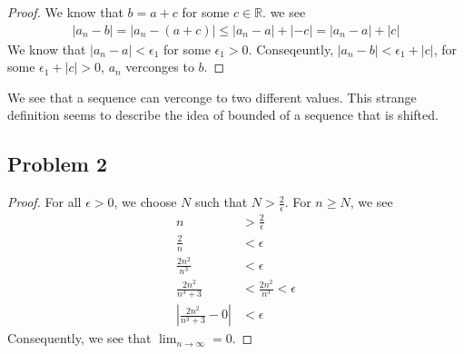 \documentclass[12pt]{article}
\begin{document}
\begin{proof}
    We know that $b  = a + c$ for some $c \in \mathbb{R}$.
    we see 
    \begin{align*}
        | a_n - b| = | a_n - (a + c)| \le |a_n - a| + |-c| = | a_n - a| + |c|
    \end{align*}
    We know that $|a_n - a| < \epsilon_1$ for some $\epsilon_1 > 0$.
    Conseqeuntly, $|a_n - b| < \epsilon_1 + |c|$, for some $ \epsilon_1 + |c| > 0 $, $a_n$ verconges to $b$.
\end{proof}

We see that a sequence can verconge to two different values. 
This strange definition seems to describe the idea of bounded of a sequence that is shifted. 




\subsection*{Problem 2}
\begin{proof}
    For all $\epsilon > 0$, we choose $N$ such that $N > \frac{2}{\epsilon}$.
    For $n \ge N$, we see 
    \begin{align*}
        n &> \frac{2}{\epsilon} \\
        \frac{2}{n} &< \epsilon \\
        \frac{2n^2}{n^3} &< \epsilon \\
        \frac{2n^2}{n^3 + 3} &< \frac{2n^2}{n^3} < \epsilon \\
        \left| {\frac{2n^2}{n^3 + 3} - 0} \right| &< \epsilon
    \end{align*}
    Consequently, we see that $\lim_{n \rightarrow \infty} = 0$. 
\end{proof}
\end{document}
